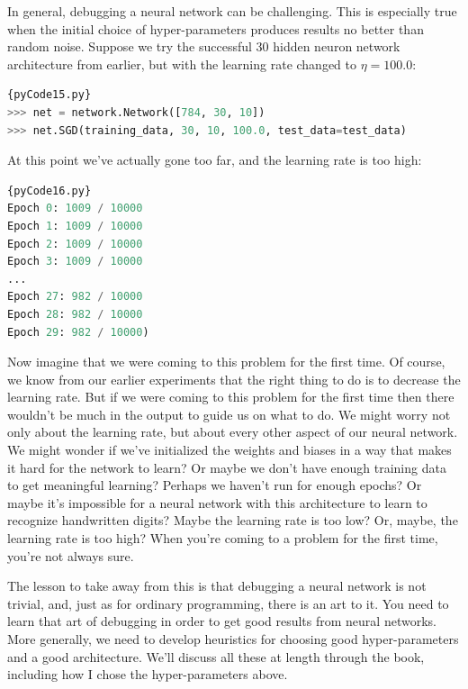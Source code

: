 \documentclass[a4paper,12pt]{report}%
\begin{document}
In general, debugging a neural network can be challenging. This is especially true when the initial choice of hyper-parameters produces results no better than random noise. Suppose we try the successful 30 hidden neuron network architecture from earlier, but with the learning rate changed to $η=100.0$:

\begin{lstlisting}[language=Python,breaklines,basicstyle=\footnotesize\ttfamily]{pyCode15.py}
>>> net = network.Network([784, 30, 10])
>>> net.SGD(training_data, 30, 10, 100.0, test_data=test_data)
\end{lstlisting}

At this point we've actually gone too far, and the learning rate is too high:

\begin{lstlisting}[language=Python,breaklines,basicstyle=\footnotesize\ttfamily]{pyCode16.py}
Epoch 0: 1009 / 10000
Epoch 1: 1009 / 10000
Epoch 2: 1009 / 10000
Epoch 3: 1009 / 10000
...
Epoch 27: 982 / 10000
Epoch 28: 982 / 10000
Epoch 29: 982 / 10000)
\end{lstlisting}

Now imagine that we were coming to this problem for the first time. Of course, we know from our earlier experiments that the right thing to do is to decrease the learning rate. But if we were coming to this problem for the first time then there wouldn't be much in the output to guide us on what to do. We might worry not only about the learning rate, but about every other aspect of our neural network. We might wonder if we've initialized the weights and biases in a way that makes it hard for the network to learn? Or maybe we don't have enough training data to get meaningful learning? Perhaps we haven't run for enough epochs? Or maybe it's impossible for a neural network with this architecture to learn to recognize handwritten digits? Maybe the learning rate is too low? Or, maybe, the learning rate is too high? When you're coming to a problem for the first time, you're not always sure.

\smallskip

The lesson to take away from this is that debugging a neural network is not trivial, and, just as for ordinary programming, there is an art to it. You need to learn that art of debugging in order to get good results from neural networks. More generally, we need to develop heuristics for choosing good hyper-parameters and a good architecture. We'll discuss all these at length through the book, including how I chose the hyper-parameters above.
\end{document}
